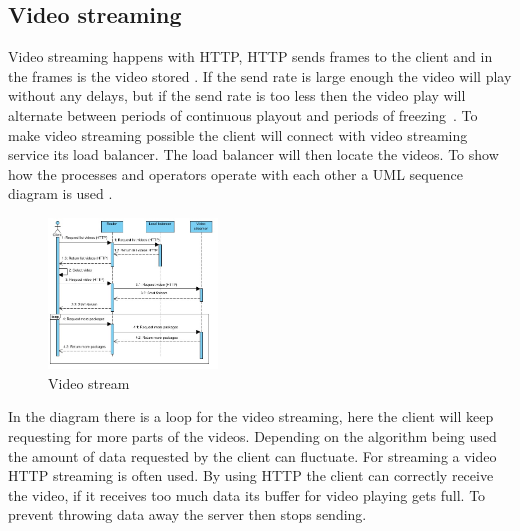 \documentclass{sig-alternate-br}
\begin{document}
\subsection{Video streaming}\label{sec:stream}
Video streaming happens with HTTP, HTTP sends frames to the client and in the frames is the video stored \cite{computer-networking}. If the send rate is large enough the video will play without any delays, but if the send rate is too less then the video play will alternate between periods of continuous playout and periods of freezing~\cite{computer-networking}. \newline 
To make video streaming possible the client will connect with video streaming service its load balancer. The load balancer will then locate the videos. To show how the processes and operators operate with each other a UML sequence diagram is used \cite{Bernardi:2002:USD:584369.584376}. 
\begin{figure}[H]
	\centering 
	\includegraphics[width=0.4\textwidth]{VideoStreaming.jpg}
	\caption{Video stream}
	\label{fig:stream} %
\end{figure}

In the diagram there is a loop for the video streaming, here the client will keep requesting for more parts of the videos. Depending on the algorithm being used the amount of data requested by the client can fluctuate. For streaming a video HTTP streaming is often used. By using HTTP the client can correctly receive the video, if it receives too much data its buffer for video playing gets full. To prevent throwing data away the server then stops sending.
\end{document}
